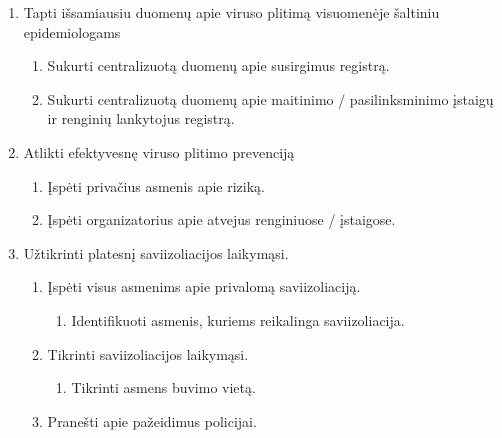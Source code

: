 \documentclass{VUMIFPSkursinis}
\begin{document}
\begin{enumerate}
	\item Tapti išsamiausiu duomenų apie viruso plitimą visuomenėje šaltiniu epidemiologams
	      \begin{enumerate}
		      \item Sukurti centralizuotą duomenų apie susirgimus registrą.
		      \item Sukurti centralizuotą duomenų apie maitinimo / pasilinksminimo įstaigų ir renginių lankytojus registrą.
	      \end{enumerate}
	\item Atlikti efektyvesnę viruso plitimo prevenciją
	      \begin{enumerate}
		      \item Įspėti privačius asmenis apie riziką.
		      \item Įspėti organizatorius apie atvejus renginiuose / įstaigose.
	      \end{enumerate}
	\item Užtikrinti platesnį saviizoliacijos laikymąsi.
	      \begin{enumerate}
		      \item Įspėti visus asmenims apie privalomą saviizoliaciją.
		            \begin{enumerate}
			            \item Identifikuoti asmenis, kuriems reikalinga saviizoliacija.
		            \end{enumerate}
		      \item Tikrinti saviizoliacijos laikymąsi.
		            \begin{enumerate}
			            \item Tikrinti asmens buvimo vietą.
		            \end{enumerate}
		      \item Pranešti apie pažeidimus policijai.
	      \end{enumerate}
\end{enumerate}
\end{document}
